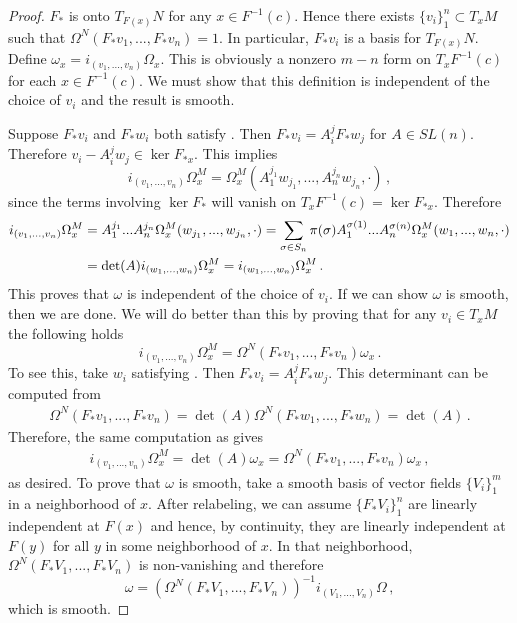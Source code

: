 \begin{proof}
$F_*$ is onto $T_{F(x)}N$ for any $x\in F^{-1}(c)$. Hence there exists $\{v_i\}_1^n\subset T_xM$ such that $\Omega^N(F_*v_1,...,F_* v_n)=1$. In particular, $F_* v_i$ is a basis for $T_{F(x)} N$. Define $\omega_x=i_{(v_1,...,v_n)}\Omega_x$. This is obviously a nonzero $m-n$ form on $T_xF^{-1}(c)$ for each $x\in F^{-1}(c)$. We must show that this definition is independent of the choice of $v_i$ and the result is smooth.

 Suppose $F_*v_i$ and $F_*w_i$ both satisfy . Then $F_*v_i=A_i^jF_*w_j$ for $A\in SL(n)$. Therefore $v_i-A_i^jw_j\in \ker F_{*x}$. This implies
\begin{equation}
i_{(v_1,...,v_n)}\Omega^M_x=\Omega^M_x(A_1^{j_1}w_{j_1},...,A_n^{j_n}w_{j_n},\cdot)\,,
\end{equation}
since the terms involving $\ker F_*$ will vanish on $T_x F^{-1}(c)=\ker F_{*x}$. Therefore
\begin{align}\label{indOfvProof}
i_{(v_1,...,v_n)}\Omega^M_x&=A_1^{j_1}...A_n^{j_n}\Omega^M_x(w_{j_1},...,w_{j_n},\cdot)
=\sum_{\sigma\in S_n} \pi(\sigma)A_1^{\sigma(1)}...A_n^{\sigma(n)}\Omega^M_x(w_1,...,w_n,\cdot)\notag\\
&=\det(A)i_{(w_1,...,w_n)}\Omega^M_x
=i_{(w_1,...,w_n)}\Omega^M_x\,.
\end{align}
This proves that $\omega$ is independent of the choice of $v_i$. If we can show $\omega$ is smooth, then we are done. We will do better than this by proving that for any $v_i\in T_xM$ the following holds
\begin{equation}
i_{(v_1,...,v_n)}\Omega^M_x=\Omega^N(F_*v_1,...,F_*v_n)\omega_x\,.
\end{equation}
To see this, take $w_i$ satisfying . Then $F_*v_i=A_i^j F_*w_j$. This determinant can be computed from
\begin{align}
\Omega^N(F_*v_1,...,F_*v_n)=\det(A)\Omega^N(F_*w_1,...,F_*w_n)=\det(A)\,.
\end{align}
Therefore, the same computation as  gives
\begin{align}
i_{(v_1,...,v_n)}\Omega^M_x=\det(A)\omega_x=\Omega^N(F_*v_1,...,F_*v_n)\omega_x\,,
\end{align}
as desired. To prove that $\omega$ is smooth, take a smooth basis of vector fields $\{V_i\}_1^m$ in a neighborhood of $x$. After relabeling, we can assume $\{F_*V_i\}_1^n$ are linearly independent at $F(x)$ and hence, by continuity, they are linearly independent at $F(y)$ for all $y$ in some neighborhood of $x$. In that neighborhood, $\Omega^N(F_*V_1,...,F_*V_n)$ is non-vanishing and therefore
\begin{equation}
\omega=(\Omega^N(F_*V_1,...,F_*V_n))^{-1}i_{(V_1,...,V_n)}\Omega\,,
\end{equation} 
which is smooth.
\end{proof}

